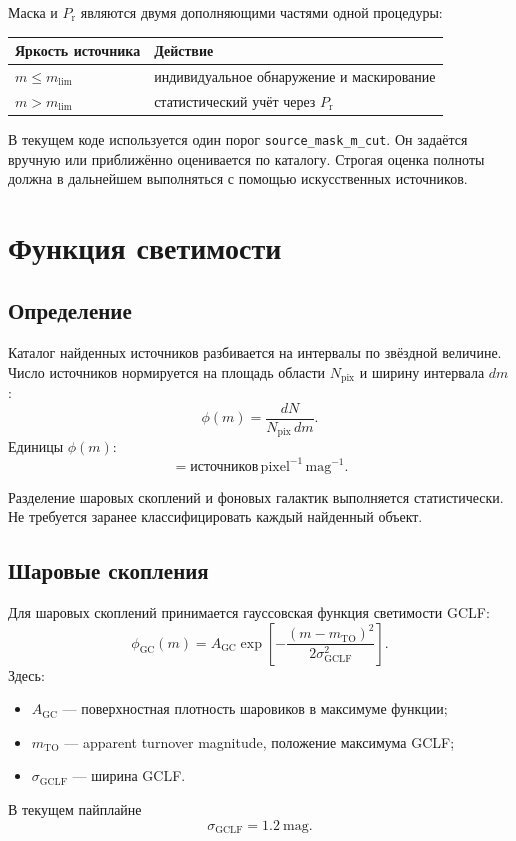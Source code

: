 \documentclass[12pt,a4paper]{article}
\newcommand{\Prpow}{P_{\mathrm r}}
\newcommand{\Phigc}{\phi_{\mathrm{GC}}}
\begin{document}
Маска и \(\Prpow\) являются двумя дополняющими частями одной
процедуры:
\begin{center}
\begin{tabular}{ll}
\toprule
Яркость источника & Действие \\
\midrule
\(m\leq m_{\mathrm{lim}}\) & индивидуальное обнаружение и маскирование \\
\(m>m_{\mathrm{lim}}\) & статистический учёт через \(\Prpow\) \\
\bottomrule
\end{tabular}
\end{center}

В текущем коде используется один порог
\texttt{source\_mask\_m\_cut}. Он задаётся вручную или
приближённо оценивается по каталогу. Строгая оценка
полноты должна в дальнейшем выполняться с помощью
искусственных источников.

\section{Функция светимости}

\subsection{Определение}

Каталог найденных источников разбивается на интервалы по
звёздной величине. Число источников нормируется на площадь
области \(N_{\mathrm{pix}}\) и ширину интервала \(dm\):
\begin{equation}
    \phi(m)=\frac{dN}{N_{\mathrm{pix}}\,dm}.
\end{equation}
Единицы \(\phi(m)\):
\begin{equation}
    [\phi] =
    \text{источников}\,
    \mathrm{pixel}^{-1}\,
    \mathrm{mag}^{-1}.
\end{equation}

Разделение шаровых скоплений и фоновых галактик выполняется
статистически. Не требуется заранее классифицировать каждый
найденный объект.

\subsection{Шаровые скопления}

Для шаровых скоплений принимается гауссовская функция
светимости GCLF:
\begin{equation}
    \Phigc(m)=
    A_{\mathrm{GC}}
    \exp\left[
        -\frac{(m-m_{\mathrm{TO}})^2}
        {2\sigma_{\mathrm{GCLF}}^2}
    \right].
\end{equation}
Здесь:
\begin{itemize}
    \item \(A_{\mathrm{GC}}\) --- поверхностная плотность
    шаровиков в максимуме функции;
    \item \(m_{\mathrm{TO}}\) --- apparent turnover magnitude,
    положение максимума GCLF;
    \item \(\sigma_{\mathrm{GCLF}}\) --- ширина GCLF.
\end{itemize}
В текущем пайплайне
\begin{equation}
    \sigma_{\mathrm{GCLF}}=1.2~\mathrm{mag}.
\end{equation}
\end{document}
